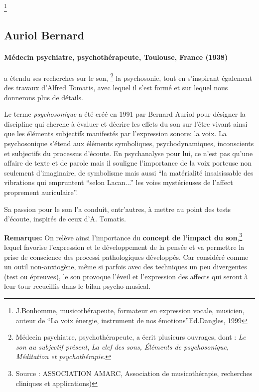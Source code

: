 \footnote{J.Bonhomme, musicothérapeute, formateur 
  	en expression vocale, musicien, auteur de ``La voix énergie,
        instrument de nos émotions''Ed.Dangles, 1999} 

      \subsection{Auriol Bernard}
 
\paragraph{Médecin psychiatre,
   psychothérapeute, Toulouse, France (1938)}
a étendu ses recherches sur le son, \footnote{Médecin psychiatre, psychothérapeute,  a écrit plusieurs ouvrages, dont : \textsl{Le son au subjectif présent}, \textsl{La clef des sons, Éléments de psychosonique}, \textsl{Méditation et
  psychothérapie}.} la psychosonie, 
tout en s'inspirant également des
travaux d'Alfred Tomatis, avec lequel il s'est formé et sur lequel
nous donnerons plus de détails.

Le terme \emph{psychosonique} a été créé en 1991 par Bernard Auriol pour
désigner la discipline qui cherche à évaluer et décrire les effets du
son sur l'être vivant ainsi que les éléments
subjectifs manifestés par l'expression sonore:  la
voix. La psychosonique s'étend aux éléments
symboliques, psychodynamiques, inconscients et subjectifs du processus
d'écoute. En psychanalyse pour lui, ce n'est pas qu'une affaire de
texte et de parole mais il souligne l'importance de la voix porteuse non seulement
d'imaginaire, de symbolisme mais aussi ``la matérialité insaisissable
des vibrations qui empruntent ``selon Lacan...'' les voies mystérieuses de
l'affect proprement auriculaire''.

\autocite[ch. 13]{auriol:cle}

Sa passion pour le son l'a conduit, entr'autres, à mettre au point des tests
d'écoute, inspirés de ceux d'A. Tomatis.




\textbf{Remarque: } 
On relève ainsi l'importance du \textbf{concept de l'impact du son},\footnote{Source : ASSOCIATION AMARC,
  Association de musicothérapie, recherches cliniques et
  applications) } 
lequel favorise l'expression et le développement de la pensée et va
permettre la prise de conscience des processi pathologiques
développés. Car considéré comme un outil non-anxiogène, même si parfois avec des
techniques un peu divergentes (test ou épreuves), le son provoque l'éveil et l'expression
des affects qui seront à leur tour recueillis dans le bilan psycho-musical.



